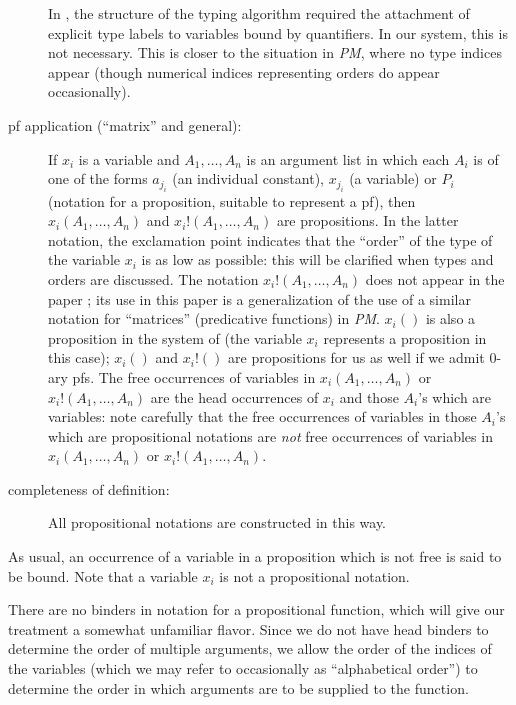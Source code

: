 \documentclass{article}
\begin{document}
\begin{description}
In \cite{types40}, the structure of the typing algorithm required the
attachment of explicit type labels to variables bound by quantifiers.
In our system, this is not necessary.  This is closer to the situation
in {\em PM\/}, where no type indices appear (though numerical indices
representing orders do appear occasionally).

\item[pf application (``matrix'' and general):] If
$x_i$ is a variable and $A_1,\ldots,A_n$ is an argument list in which
each $A_i$ is of one of the forms $a_{j_i}$ (an individual constant),
$x_{j_i}$ (a variable) or $P_i$ (notation for a proposition, suitable
to represent a pf), then $x_i(A_1,\ldots,A_n)$ and
$x_i!(A_1,\ldots,A_n)$ are propositions.  In the latter notation, the
exclamation point indicates that the ``order'' of the type of the
variable $x_i$ is as low as possible: this will be clarified when
types and orders are discussed.  The notation $x_i!(A_1,\ldots,A_n)$
does not appear in the paper \cite{types40}; its use in this paper is
a generalization of the use of a similar notation for ``matrices''
(predicative functions) in {\em PM\/}.  $x_i()$ is also a proposition
in the system of \cite{types40} (the variable $x_i$ represents
a proposition in this case); $x_i()$ and $x_i!()$ are propositions for
us as well if we admit 0-ary pfs.  The free occurrences of variables
in $x_i(A_1,\ldots,A_n)$ or $x_i!(A_1,\ldots,A_n)$ are the head
occurrences of $x_i$ and those $A_i$'s which are variables: note
carefully that the free occurrences of variables in those $A_i$'s
which are propositional notations are {\em not\/} free occurrences of
variables in $x_i(A_1,\ldots,A_n)$ or $x_i!(A_1,\ldots,A_n)$.

\item[completeness of definition:]  
All propositional notations are constructed in this way.

\end{description}

As usual, an occurrence of a variable in a proposition which is not
free is said to be bound.  Note that a variable $x_i$ is not a
propositional notation.

There are no binders in notation for a propositional function, which
will give our treatment a somewhat unfamiliar flavor. Since we do not
have head binders to determine the order of multiple arguments, we
allow the order of the indices of the variables (which we may refer to
occasionally as ``alphabetical order'') to determine the order in
which arguments are to be supplied to the function.
\end{document}
